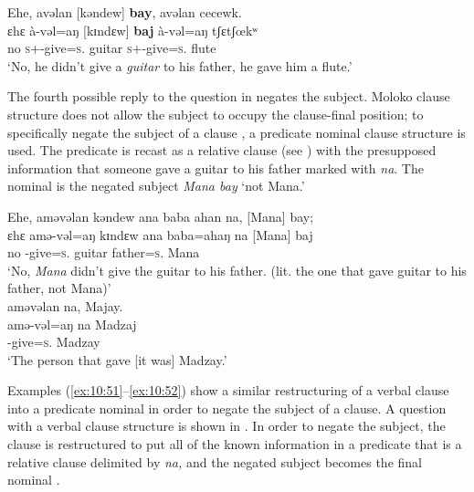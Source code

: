\ea \label{ex:10:49}
Ehe,  avəlan  [kəndew]  \textbf{bay},  avəlan  cecewk.\\
\gll  ɛhɛ    à-vəl=aŋ   [kɪndɛw]   \textbf{baj} à-vəl=aŋ tʃɛtʃœkʷ\\
      no    \textsc{s}+{\PFV}-give=\textsc{s}.{\IO}  guitar    {\NEG} \textsc{s}+{\PFV}-give=\textsc{s}.{\IO}  flute\\
\glt  ‘No, he didn’t give a \textit{guitar} to his father, he gave him a flute.’ 
\z

The fourth possible reply to the question in  negates the subject. Moloko clause structure does not allow the subject to occupy the clause-final position; to specifically negate the subject of a clause , a predicate nominal clause structure is used. The predicate is recast as a relative clause (see ) with the presupposed information that someone gave a guitar to his father marked with \textit{na}. The nominal is the negated subject \textit{Mana bay} ‘not Mana.’ 

\ea \label{ex:10:50}
Ehe,  aməvəlan  kəndew  ana  baba  ahan  na,  [Mana]  bay;\\  
\gll  ɛhɛ    amə-vəl=aŋ  kɪndɛw  ana  baba=ahaŋ    na [Mana]  baj \\ 
      no    {\DEP}-give=\textsc{s}.{\IO}  guitar  {\DAT} father=\textsc{s}.{\POSS}  {\PSP} Mana     {\NEG}  \\    
\glt ‘No, \textit{Mana} didn’t give the guitar to his father.  (lit. the one that gave guitar to his father, not Mana)’ \\    
           
      \clearpage
aməvəlan  na,  Majay.\\      
\gll amə-vəl=aŋ na Madzaj\\
     {\DEP}-give=\textsc{s}.{\IO}  {\PSP}  Madzay\\
\glt  ‘The person that gave [it was] Madzay.’ 
\z

Examples (\ref{ex:10:51}--\ref{ex:10:52}) show a similar restructuring of a verbal clause into a predicate nominal in order to negate the subject of a clause. A question with a verbal clause structure is shown in . In order to negate the subject, the clause is restructured to put all of the known information in a predicate that is a relative clause delimited by\textit{ na,} and the negated subject becomes the final nominal . 

